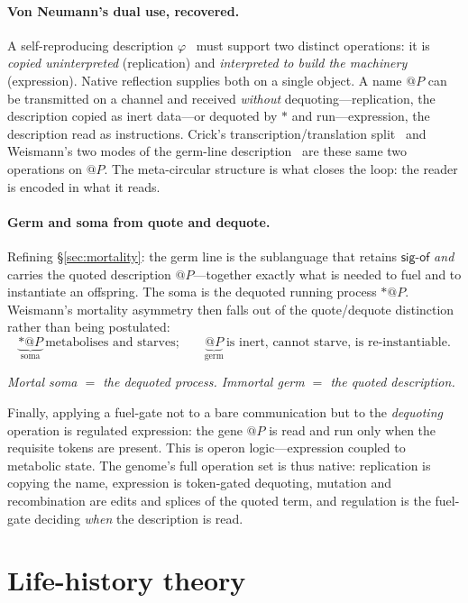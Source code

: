 \documentclass[11pt]{article}
\makeatletter
\theoremstyle{plain}
\theoremstyle{definition}
\theoremstyle{remark}
\newcommand{\sigof}{\mathsf{sig\text{-}of}}
\newcommand{\quo}[1]{@#1}
\newcommand{\deq}[1]{{\ast}#1}
\makeatother
\begin{document}
\paragraph{Von Neumann's dual use, recovered.}
A self-reproducing description $\varphi$~\cite{vonneumann1966} must support two
distinct operations:
it is \emph{copied uninterpreted} (replication) and \emph{interpreted to build
the machinery} (expression). Native reflection supplies both on a single
object. A name $\quo P$ can be transmitted on a channel and received
\emph{without} dequoting---replication, the description copied as inert
data---or dequoted by $\deq{}$ and run---expression, the description read as
instructions. Crick's transcription/translation split~\cite{crick1970} and
Weismann's two modes
of the germ-line description~\cite{weismann1893} are these same two operations on $\quo P$. The
meta-circular structure is what closes the loop: the reader is encoded in what
it reads.

\paragraph{Germ and soma from quote and dequote.}
Refining \S\ref{sec:mortality}: the germ line is the sublanguage that retains
$\sigof$ \emph{and} carries the quoted description $\quo P$---together exactly
what is needed to fuel and to instantiate an offspring. The soma is the dequoted
running process $\deq{\quo P}$. Weismann's mortality asymmetry then falls out of
the quote/dequote distinction rather than being postulated:
\[
  \underbrace{\deq{\quo P}}_{\text{soma}}\ \text{metabolises and starves;}
  \qquad
  \underbrace{\quo P}_{\text{germ}}\ \text{is inert, cannot starve, is re-instantiable.}
\]
\begin{center}
\textit{Mortal soma $=$ the dequoted process. Immortal germ $=$ the quoted description.}
\end{center}
Finally, applying a fuel-gate not to a bare communication but to the
\emph{dequoting} operation is regulated expression: the gene $\quo P$ is read and
run only when the requisite tokens are present. This is operon logic---expression
coupled to metabolic state. The genome's full operation set is thus native:
replication is copying the name, expression is token-gated dequoting, mutation
and recombination are edits and splices of the quoted term, and regulation is
the fuel-gate deciding \emph{when} the description is read.

\section{Life-history theory}
\label{sec:lifehistory}
\end{document}
